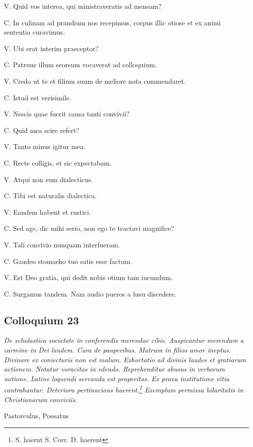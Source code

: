 \documentclass{article}
\begin{document}
V. Quid vos interea, qui ministraveratis ad mensam?

C. In culinam ad prandium nos recepimus, corpus illic otiose et ex animi sententia curavimus.

V. Ubi erat interim praeceptor?

C. Patruus illum seorsum vocaverat ad colloquium.

V. Credo ut te et filium suum de meliore nota commendaret.

C. Istud est verisimile.

V. Nescis quae fuerit causa tanti convivii?

C. Quid mea scire refert?

V. Tanto minus igitur mea.

C. Recte colligis, et sic expectabam.

V. Atqui non sum dialecticus.

C. Tibi est naturalis dialectica.

V. Eandem habent et rustici.

C. Sed age, dic mihi serio, non ego te tractavi magnifice?

V. Tali convivio nunquam interfueram.

C. Gaudeo stomacho tuo satis esse factum.

V. Est Deo gratia, qui dedit nobis otium tam iucundum.

C. Surgamus tandem. Nam audio pueros a lusu discedere.

\subsection{Colloquium 23}
\emph{De scholastica societate in conferendis merendae cibis. Auspicantur merendam a carmine in Dei laudem. Cura de pauperibus. Matrum in filios amor ineptus. Divinare ex coniecturis non est malum. Exhortatio ad divinis laudes et gratiarum actionem. Notatur voracitas in edendo. Reprehenditur abusus in verborum notione. Latine loquendi servanda est properitas. Ex prava institutione vitia contrahantur. Deteriora pertinacious haerent.\footnote{S. haerut S. Corr. D. haerent} Exemplum permissa hilaritatis in Christianorum conviviis.}

Pastorculus, Poesatus
\end{document}
